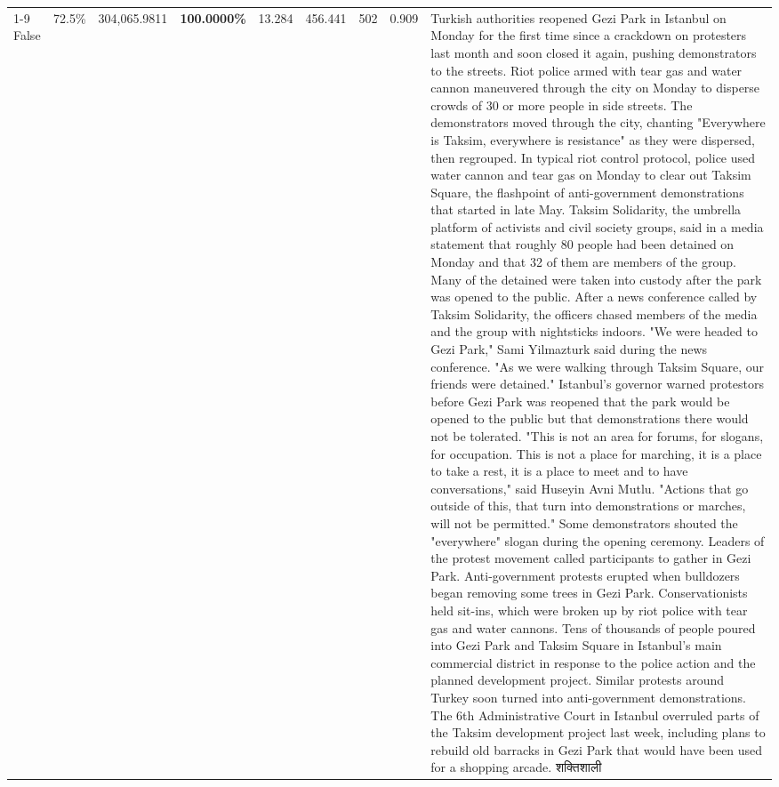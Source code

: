 \begin{table}[H]
\begin{tabular}{lllrlllll}
\cline{1-9}
False & 72.5\% & \color{red} 304,065.9811 & \bfseries \color{red} 100.0000\% & 13.284 & 456.441 & 502 & 0.909 & Turkish authorities reopened Gezi Park in Istanbul on Monday for the first time since a crackdown on protesters last month and soon closed it again, pushing demonstrators to the streets. Riot police armed with tear gas and water cannon maneuvered through the city on Monday to disperse crowds of 30 or more people in side streets. The demonstrators moved through the city, chanting "Everywhere is Taksim, everywhere is resistance" as they were dispersed, then regrouped. In typical riot control protocol, police used water cannon and tear gas on Monday to clear out Taksim Square, the flashpoint of anti-government demonstrations that started in late May. Taksim Solidarity, the umbrella platform of activists and civil society groups, said in a media statement that roughly 80 people had been detained on Monday and that 32 of them are members of the group. Many of the detained were taken into custody after the park was opened to the public. After a news conference called by Taksim Solidarity, the officers chased members of the media and the group with nightsticks indoors. "We were headed to Gezi Park," Sami Yilmazturk said during the news conference. "As we were walking through Taksim Square, our friends were detained." Istanbul's governor warned protestors before Gezi Park was reopened that the park would be opened to the public but that demonstrations there would not be tolerated. "This is not an area for forums, for slogans, for occupation. This is not a place for marching, it is a place to take a rest, it is a place to meet and to have conversations," said Huseyin Avni Mutlu. "Actions that go outside of this, that turn into demonstrations or marches, will not be permitted." Some demonstrators shouted the "everywhere" slogan during the opening ceremony. Leaders of the protest movement called participants to gather in Gezi Park. Anti-government protests erupted when bulldozers began removing some trees in Gezi Park. Conservationists held sit-ins, which were broken up by riot police with tear gas and water cannons. Tens of thousands of people poured into Gezi Park and Taksim Square in Istanbul's main commercial district in response to the police action and the planned development project. Similar protests around Turkey soon turned into anti-government demonstrations. The 6th Administrative Court in Istanbul overruled parts of the Taksim development project last week, including plans to rebuild old barracks in Gezi Park that would have been used for a shopping arcade. शक्तिशाली \\

\end{tabular}
\end{table}
